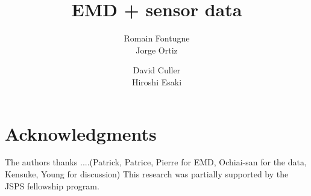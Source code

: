 \documentclass[letter,10pt]{sig-alternate-10pt}
\begin{document}
\title{EMD + sensor data}

\author{
\alignauthor
Romain Fontugne\\
\alignauthor
Jorge Ortiz\\
\and  %
\alignauthor
David Culler\\
\alignauthor 
Hiroshi Esaki\\
}

\maketitle

% 
% 











\section*{Acknowledgments}
The authors thanks ....(Patrick, Patrice, Pierre for EMD, Ochiai-san for the data, Kensuke, Young for discussion)
This research was partially supported by the JSPS fellowship program.



\end{document}
